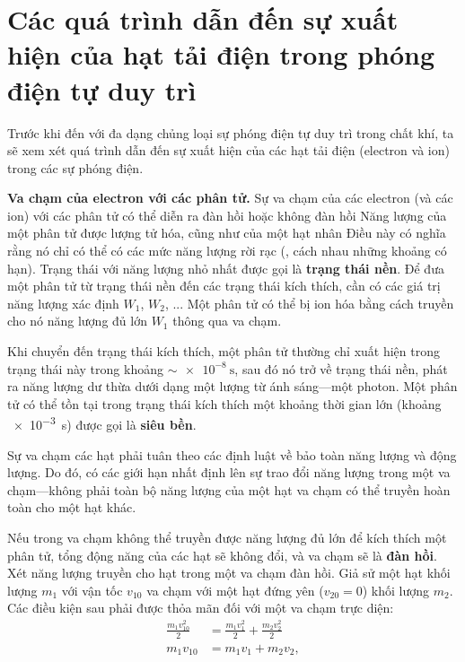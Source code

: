 \section[Các quá trình dẫn đến sự xuất hiện của các hạt tải điện]{Các quá trình dẫn đến sự xuất hiện của hạt tải điện trong phóng điện tự duy trì}\label{sec:12_4}

Trước khi đến với đa dạng chủng loại sự phóng điện tự duy trì trong chất khí, ta sẽ xem xét quá trình dẫn đến sự xuất hiện của các hạt tải điện (electron và ion) trong các sự phóng điện.

\textbf{Va chạm của electron với các phân tử.} Sự va chạm của các electron (và các ion) với các phân tử có thể diễn ra đàn hồi hoặc không đàn hồi
Năng lượng của một phân tử được lượng tử hóa, cũng như của một hạt nhân
Điều này có nghĩa rằng nó chỉ có thể có các mức năng lượng rời rạc (\ie, cách nhau những khoảng có hạn).
Trạng thái với năng lượng nhỏ nhất được gọi là \textbf{trạng thái nền}.
Để đưa một phân tử từ trạng thái nền đến các trạng thái kích thích, cần có các giá trị năng lượng xác định $W_1$, $W_2$, ...
Một phân tử có thể bị ion hóa bằng cách truyền cho nó năng lượng đủ lớn $W_1$ thông qua va chạm.

Khi chuyển đến trạng thái kích thích, một phân tử thường chỉ xuất hiện trong trạng thái này trong khoảng $\sim\SI{e-8}{\second}$, sau đó nó trở về trạng thái nền, phát ra năng lượng dư thừa dưới dạng một lượng từ ánh sáng---một photon. 
Một phân tử có thể tồn tại trong trạng thái kích thích một khoảng thời gian lớn (khoảng \SI{e-3}{\second}) được gọi là \textbf{siêu bền}.

Sự va chạm các hạt phải tuân theo các định luật về bảo toàn năng lượng và động lượng.
Do đó, có các giới hạn nhất định lên sự trao đổi năng lượng trong một va chạm---không phải toàn bộ năng lượng của một hạt va chạm có thể truyền hoàn toàn cho một hạt khác.

Nếu trong va chạm không thể truyền được năng lượng đủ lớn để kích thích một phân tử, tổng động năng của các hạt sẽ không đổi, và va chạm sẽ là \textbf{đàn hồi}.
Xét năng lượng truyền cho hạt trong một va chạm đàn hồi.
Giả sử một hạt khối lượng $m_1$ với vận tốc $v_{10}$ va chạm với một hạt đứng yên ($v_{20} = 0$) khối lượng $m_2$. Các điều kiện sau phải được thỏa mãn đối với một va chạm trực diện: 
\begin{align*}
    \frac{m_1v_{10}^2}{2} &= \frac{m_1v_1^2}{2} + \frac{m_2v_2^2}{2}\\
    m_1v_{10} &= m_1v_1 + m_2v_2,
\end{align*}

